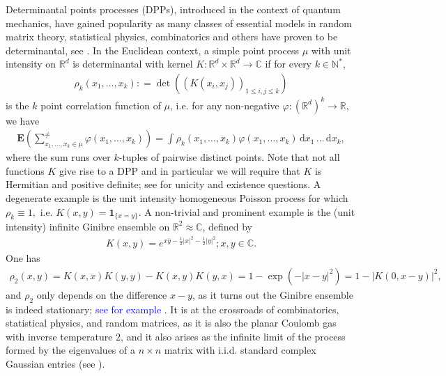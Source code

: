 \documentclass[12pt]{article}
\newcommand{\1}{\mathbf{1}}
\newcommand{\md}{\mathrm{d}}
\newcommand{\dy}[1]{\textcolor{blue}{#1}}
\newcommand{\dy}[1]{#1}%
\begin{document}
{{{{Determinantal points processes (DPPs), introduced in the context of quantum mechanics, have gained popularity as many classes of essential models in random matrix theory, statistical physics, combinatorics and others have proven to be determinantal, see \cite{hough2009zeros}. In the Euclidean context, a simple   point process $ \mu $ with unit intensity on $ \mathbb{R}^{d}$ is determinantal with  kernel
 $ K:\mathbb{R}^{d}\times \mathbb{R}^{d} \to \mathbb{C}$ if for every $ k\in \mathbb{N}^{*}$,
\begin{align*}\rho _{k}(x_{ 1},\dots ,x_{k}): = \det((K(x_{i},x_{j}))_{ 1\leqslant i,j\leqslant k})
\end{align*}
is the $ k$ point correlation function of $ \mu $, i.e.
for any non-negative $ \varphi :(\mathbb{R}^{d})^{k}\to \mathbb{R}$, we have
\begin{align*}\mathbf{E}\left(
\sum_{x_{ 1},\dots ,x_{k}\in \mu }^{\neq }\varphi (x_{ 1},\dots ,x_{k})
\right) = \int_{}\rho _{k}(x_{ 1},\dots ,x_{k})\varphi(x_{ 1},\dots ,x_{k})\, \md x_{ 1} \, \dots \, \md x_{k} ,
\end{align*}
where the sum runs over $ k$-tuples of pairwise distinct points. Note that not all functions $ K$ give rise to a DPP and in particular we will require that $K$ is Hermitian and positive definite; see  \cite[Section 4.5]{hough2009zeros} for unicity and existence questions. A {degenerate} example is the unit intensity homogeneous Poisson process for which $ \rho _{k} \equiv  1,$ i.e. $K (x,y) = \mathbf{1}_{\{x = y\}}.$ {A non-trivial and prominent example} is the (unit intensity) infinite Ginibre ensemble on $\mathbb{R}^{2}\approx  \mathbb C $, defined by
\begin{align*}K(x,y) = e^{x\bar y-\frac{1}{2}|x|^2-\frac{1}{2}|y|^2};x,y\in  \mathbb C .
\end{align*}
One has \begin{align*}\rho _{2}(x,y) = K(x,x)K(y,y)-K(x,y)K(y,x) = 1-\exp(- | x-y | ^{2}) = 1- | K(0,x-y) | ^{2},
\end{align*}
and $\rho_{2}$ only depends on the difference $ x-y$, as it turns out  the Ginibre ensemble is indeed stationary; \dy{see for example \cite[Proposition 5.6.6]{baccelli2020random}}. It is at the crossroads of combinatorics, statistical physics, and random matrices, as it is also the planar Coulomb gas with inverse temperature $ 2$, and it also arises as the infinite limit of the process formed by the eigenvalues of a $ n\times n$ matrix with i.i.d.   standard complex Gaussian entries (see  \cite{hough2009zeros}).

}}}}
\end{document}
